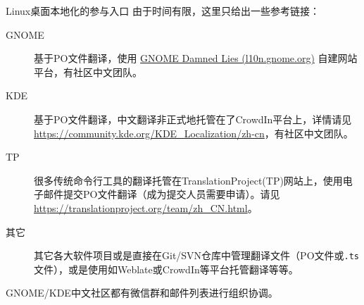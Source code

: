 
\begin{frame}{Linux桌面本地化的参与入口}
    由于时间有限，这里只给出一些参考链接：
    \begin{description}
    	\item[GNOME] 基于PO文件翻译，使用 \href{https://l10n.gnome.org}{GNOME Damned Lies (l10n.gnome.org)} 自建网站平台，有社区中文团队。
    	\item[KDE] 基于PO文件翻译，中文翻译非正式地托管在了CrowdIn平台上，详情请见 \href{https://community.kde.org/KDE\_Localization/zh-cn}{https://community.kde.org/KDE\_Localization/zh-cn}，有社区中文团队。
    	\item[TP] 很多传统命令行工具的翻译托管在TranslationProject(TP)网站上，使用电子邮件提交PO文件翻译（成为提交人员需要申请）。请见 \href{https://translationproject.org/team/zh\_CN.html}{https://translationproject.org/team/zh\_CN.html}。
    	\item[其它] 其它各大软件项目或是直接在Git/SVN仓库中管理翻译文件（PO文件或\texttt{.ts}文件），或是使用如Weblate或CrowdIn等平台托管翻译等等。
    \end{description}

    GNOME/KDE中文社区都有微信群和邮件列表进行组织协调。
\end{frame}